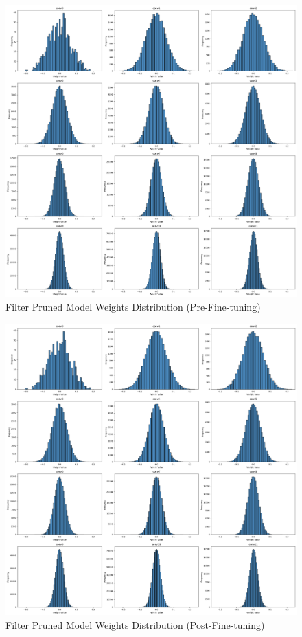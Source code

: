 \documentclass[12pt]{article}
\begin{document}
\begin{figure}[h]
  \centering
  \includegraphics[width=1\linewidth]{report_images/filter_dist_pp.png}
  \caption{\label{fig:filter_dist_pp}Filter Pruned Model Weights Distribution (Pre-Fine-tuning)}
\end{figure}
\FloatBarrier

\begin{figure}[h]
  \centering
  \includegraphics[width=1\linewidth]{report_images/filter_dist_ft.png}
  \caption{\label{fig:filter_dist_ft}Filter Pruned Model Weights Distribution (Post-Fine-tuning)}
\end{figure}
\FloatBarrier
\pagebreak
\end{document}

